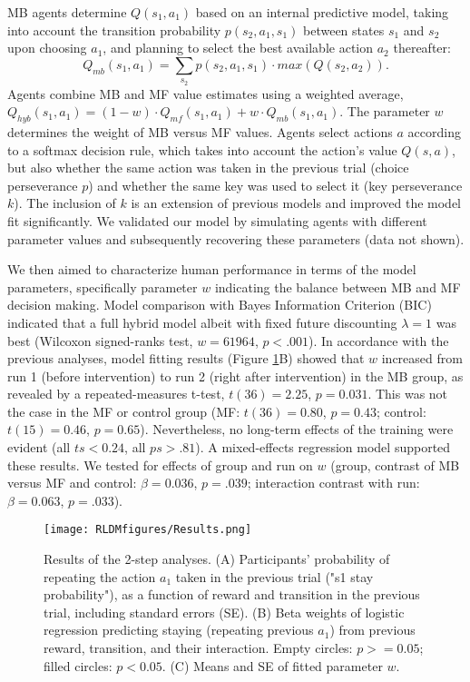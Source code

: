 \documentclass[11pt]{article} %
\begin{document}
MB agents determine $Q(s_{1}, a_{1})$ based on an internal predictive model, taking into account the transition probability $p(s_{2}, a_{1}, s_{1})$ between states $s_{1}$ and $s_{2}$ upon choosing $a_{1}$, and planning to select the best available action $a_{2}$ thereafter:
%
\begin{equation}
Q_{mb}(s_{1}, a_{1}) = \sum_{s_{2}} p(s_{2}, a_{1}, s_{1}) \cdot max(Q(s_{2}, a_{2})).
\end{equation}
%
Agents combine MB and MF value estimates using a weighted average, $Q_{hyb}(s_{1}, a_{1}) = (1 - w) \cdot Q_{mf}(s_{1}, a_{1}) + w \cdot Q_{mb}(s_{1}, a_{1})$. The parameter $w$ determines the weight of MB versus MF values. Agents select actions $a$ according to a softmax decision rule, which takes into account the action's value $Q(s, a)$, but also whether the same action was taken in the previous trial (choice perseverance $p$) and whether the same key was used to select it (key perseverance $k$). The inclusion of $k$ is an extension of previous models and improved the model fit significantly. We validated our model by simulating agents with different parameter values and subsequently recovering these parameters (data not shown).

We then aimed to characterize human performance in terms of the model parameters, specifically parameter $w$ indicating the balance between MB and MF decision making. Model comparison with Bayes Information Criterion (BIC) indicated that a full hybrid model albeit with fixed future discounting $\lambda=1$ was best (Wilcoxon signed-ranks test, $w = 61964$, $p < .001$). In accordance with the previous analyses, model fitting results (Figure \ref{Results}B) showed that $w$ increased from run 1 (before intervention) to run 2 (right after intervention) in the MB group, as revealed by a repeated-measures t-test, $t(36) = 2.25$, $p = 0.031$. This was not the case in the MF or control group (MF: $t(36) = 0.80$, $p = 0.43$; control: $t(15) = 0.46$, $p = 0.65$). Nevertheless, no long-term effects of the training were evident (all $ts < 0.24$, all $ps > .81$). A mixed-effects regression model supported these results. We tested for effects of group and run on $w$ (group, contrast of MB versus MF and control: $\beta = 0.036$, $p = .039$; interaction contrast with run: $\beta = 0.063$, $p = .033$).
%
\begin{figure}
	\texttt{[image: RLDMfigures/Results.png]}
	\caption{Results of the 2-step analyses. (A) Participants' probability of repeating the action $a_{1}$ taken in the previous trial ("s1 stay probability"), as a function of reward and transition in the previous trial, including standard errors (SE). (B) Beta weights of logistic regression predicting staying (repeating previous $a_{1}$) from previous reward, transition, and their interaction. Empty circles: $p >= 0.05$; filled circles: $p < 0.05$. (C) Means and SE of fitted parameter $w$.}
	\label{Results}
\end{figure}
%
\end{document}
